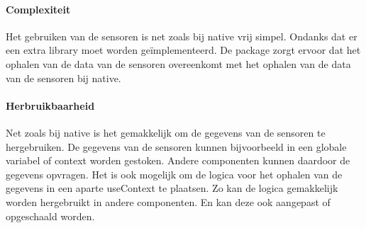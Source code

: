 \paragraph{Complexiteit}
Het gebruiken van de sensoren is net zoals bij native vrij simpel. Ondanks dat er een extra library moet worden
geïmplementeerd. De package zorgt ervoor dat het ophalen van de data van de sensoren overeenkomt met het 
ophalen van de data van de sensoren bij native. 

\paragraph{Herbruikbaarheid}
Net zoals bij native is het gemakkelijk om de gegevens van de sensoren te hergebruiken. De gegevens van de sensoren 
kunnen bijvoorbeeld in een globale variabel of context worden gestoken. Andere componenten kunnen daardoor de gegevens 
opvragen. Het is ook mogelijk om de logica voor het ophalen van de gegevens
in een aparte useContext te plaatsen. Zo kan de logica gemakkelijk worden hergebruikt in andere componenten.
En kan deze ook aangepast of opgeschaald worden. 
